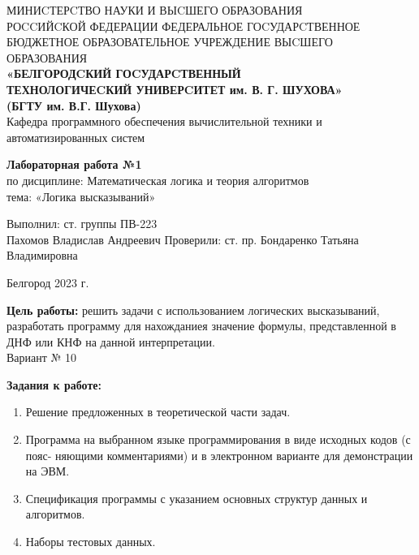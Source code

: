 \documentclass[a4paper,14pt]{extarticle}
\newcommand\textbox[1]{
	\parbox{.45\textwidth}{#1}
}
\begin{document}
\begin{center}
	\small{
		МИНИCТЕРCТВО НАУКИ И ВЫCШЕГО ОБРАЗОВАНИЯ \\РОCCИЙCКОЙ ФЕДЕРАЦИИ
		\bigbreak
		ФЕДЕРАЛЬНОЕ ГОCУДАРCТВЕННОЕ БЮДЖЕТНОЕ ОБРАЗОВАТЕЛЬНОЕ УЧРЕЖДЕНИЕ ВЫCШЕГО ОБРАЗОВАНИЯ \\
		\bigbreak
		\textbf{«БЕЛГОРОДCКИЙ ГОCУДАРCТВЕННЫЙ \\ТЕХНОЛОГИЧЕCКИЙ УНИВЕРCИТЕТ им. В. Г. ШУХОВА»\\ (БГТУ им. В.Г. Шухова)} \\
		\bigbreak
		Кафедра программного обеспечения вычислительной техники и автоматизированных систем\\}
\end{center}

\vfill
\begin{center}
	\large{
		\textbf{
			Лабораторная работа №1}}\\
	\normalsize{
		по дисциплине: Математическая логика и теория алгоритмов \\
		тема: «Логика высказываний»}
\end{center}
\vfill
\hfill\textbox{
	Выполнил: ст. группы ПВ-223\\Пахомов Владислав Андреевич
	\bigbreak
	Проверили: ст. пр. Бондаренко Татьяна \\Владимировна
}
\vfill\begin{center}
	Белгород 2023 г.
\end{center}

\newpage
\textbf{Цель работы:} решить задачи с использованием логических высказываний, разработать программу
для нахожданиея значение формулы, представленной в ДНФ или КНФ на данной интерпретации.\\
Вариант № 10
\begin{center}\textbf{Задания к работе:}\end{center}
\begin{enumerate}[1. ]
    \item Решение предложенных в теоретической части задач.

    \item Программа на выбранном языке программирования в виде исходных кодов (с пояс-
    няющими комментариями) и в электронном варианте для демонстрации на ЭВМ.
    
    \item Спецификация программы с указанием основных структур данных и алгоритмов.
    \item Наборы тестовых данных.
\end{enumerate}
\newpage
\end{document}
